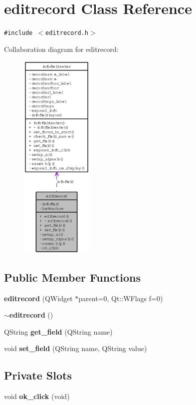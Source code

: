 \section{editrecord Class Reference}
\label{classeditrecord}
{\tt \#include $<$editrecord.h$>$}

Collaboration diagram for editrecord:\begin{figure}[H]
\begin{center}
\leavevmode
\includegraphics[width=98pt]{classeditrecord__coll__graph}
\end{center}
\end{figure}
\subsection*{Public Member Functions}
\begin{CompactItemize}
\item 
{\bf editrecord} (QWidget $\ast$parent=0, Qt::WFlags f=0)
\item 
{\bf $\sim$editrecord} ()
\item 
QString {\bf get\_\-field} (QString name)
\item 
void {\bf set\_\-field} (QString name, QString value)
\end{CompactItemize}
\subsection*{Private Slots}
\begin{CompactItemize}
\item 
void {\bf ok\_\-click} (void)
\end{CompactItemize}
